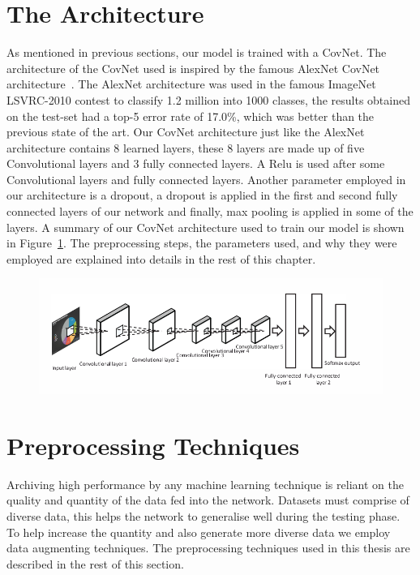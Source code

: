 \documentclass[12pt, a4paper,oneside]{report}
\begin{document}
\section{The Architecture}
As mentioned in previous sections, our model is trained with a CovNet. The architecture of the CovNet used is inspired by the famous AlexNet CovNet architecture~\cite{krizhevsky2012imagenet}. The AlexNet architecture was used in the famous ImageNet LSVRC-2010 contest to classify 1.2 million into 1000 classes, the results obtained on the test-set had a top-5 error rate of 17.0\%, which was better than the previous state of the art. Our CovNet architecture just like the AlexNet architecture contains 8 learned layers, these 8 layers are made up of five Convolutional layers and 3 fully connected layers. A Relu is used after some Convolutional layers and fully connected layers. Another parameter employed in our architecture is a dropout, a dropout is applied in the first and second fully connected layers of our network and finally, max pooling is applied in some of the layers. A summary of our CovNet architecture used to train our model is shown in Figure~\ref{fig:archi}. The preprocessing steps, the parameters used, and why they were employed are explained into details in the rest of this chapter.

\begin{figure}[!htbp]
\centering
\includegraphics [scale=0.5] {architectur}
\label{fig:archi}
\end{figure}


\section{Preprocessing Techniques}
Archiving high performance by any machine learning technique is reliant on the quality and quantity of the data fed into the network.
Datasets must comprise of diverse data, this helps the network to generalise well during the testing phase. To help increase the quantity and also generate more diverse data we employ data augmenting techniques. The preprocessing techniques used in this thesis are described in the rest of this section.
\end{document}
